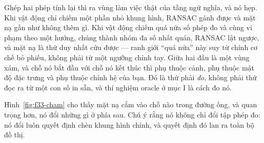 \documentclass[../../deep_learning.tex]{subfiles}
\begin{document}
Ghép hai phép tính lại thì ra vùng làm việc thật của tầng ngữ nghĩa, và nó hẹp. Khi vật động chỉ chiếm một phần nhỏ khung hình, RANSAC gánh được và mặt nạ gần như không thêm gì. Khi vật động chiếm quá nửa số phép đo và cùng vi phạm theo một hướng, chúng thành nhóm đa số nhất quán, RANSAC lật ngược, và mặt nạ là thứ duy nhất cứu được --- ranh giới ``quá nửa'' này suy từ chính cơ chế bỏ phiếu, không phải từ một ngưỡng chỉnh tay. Giữa hai đầu là một vùng xám, và chỗ nó bắt đầu với chỗ nó kết thúc thì phụ thuộc cảnh, phụ thuộc mật độ đặc trưng và phụ thuộc chính hệ của bạn. Đó là thứ phải \emph{đo}, không phải thứ đọc ra từ một con số in sẵn, và thí nghiệm oracle ở mục I là cách đo nó.

Hình~\ref{fig:f33-cham} cho thấy mặt nạ cắm vào chỗ nào trong đường ống, và quan trọng hơn, nó đổi những gì ở phía sau. Chú ý rằng nó không chỉ đổi tập phép đo: nó đổi luôn quyết định chèn khung hình chính, và quyết định đó lan ra toàn bộ đồ thị.
\end{document}
